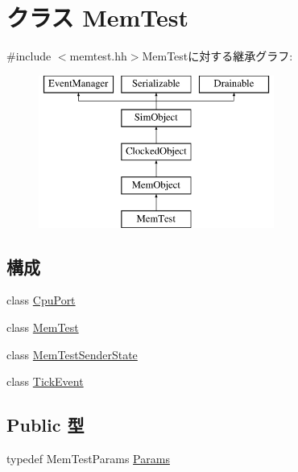 \hypertarget{classMemTest}{
\section{クラス MemTest}
\label{classMemTest}
}


{\ttfamily \#include $<$memtest.hh$>$}MemTestに対する継承グラフ:\begin{figure}[H]
\begin{center}
\leavevmode
\includegraphics[height=5cm]{classMemTest}
\end{center}
\end{figure}
\subsection*{構成}
\begin{DoxyCompactItemize}
\item 
class \hyperlink{classMemTest_1_1CpuPort}{CpuPort}
\item 
class \hyperlink{classMemTest_1_1MemTest}{MemTest}
\item 
class \hyperlink{classMemTest_1_1MemTestSenderState}{MemTestSenderState}
\item 
class \hyperlink{classMemTest_1_1TickEvent}{TickEvent}
\end{DoxyCompactItemize}
\subsection*{Public 型}
\begin{DoxyCompactItemize}
\item 
typedef MemTestParams \hyperlink{classMemTest_a9c0e666eb773a0cfe77b832270b05c24}{Params}
\end{DoxyCompactItemize}
